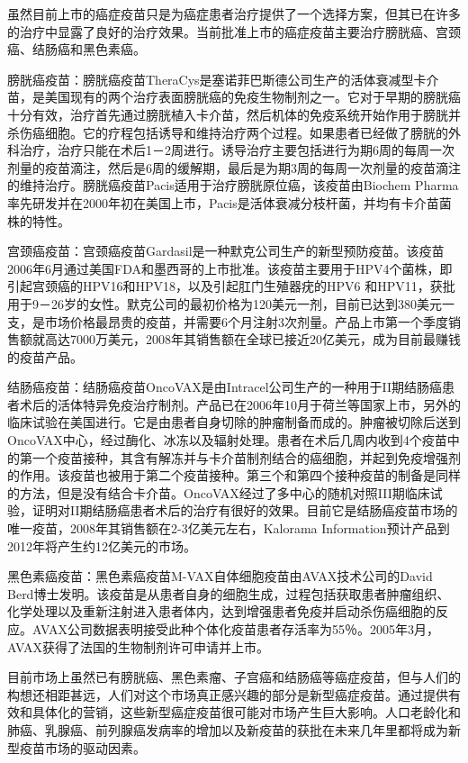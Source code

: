 虽然目前上市的癌症疫苗只是为癌症患者治疗提供了一个选择方案，但其已在许多的治疗中显露了良好的治疗效果。当前批准上市的癌症疫苗主要治疗膀胱癌、宫颈癌、结肠癌和黑色素癌。

膀胱癌疫苗：膀胱癌疫苗TheraCys是塞诺菲巴斯德公司生产的活体衰减型卡介苗，是美国现有的两个治疗表面膀胱癌的免疫生物制剂之一。它对于早期的膀胱癌十分有效，治疗首先通过膀胱植入卡介苗，然后机体的免疫系统开始作用于膀胱并杀伤癌细胞。它的疗程包括诱导和维持治疗两个过程。如果患者已经做了膀胱的外科治疗，治疗只能在术后1－2周进行。诱导治疗主要包括进行为期6周的每周一次剂量的疫苗滴注，然后是6周的缓解期，最后是为期3周的每周一次剂量的疫苗滴注的维持治疗。膀胱癌疫苗Pacis适用于治疗膀胱原位癌，该疫苗由Biochem
Pharma率先研发并在2000年初在美国上市，Pacis是活体衰减分枝杆菌，并均有卡介苗菌株的特性。

宫颈癌疫苗：宫颈癌疫苗Gardasil是一种默克公司生产的新型预防疫苗。该疫苗2006年6月通过美国FDA和墨西哥的上市批准。该疫苗主要用于HPV4个菌株，即引起宫颈癌的HPV16和HPV18，以及引起肛门生殖器疣的HPV6
和HPV11，获批用于9－26岁的女性。默克公司的最初价格为120美元一剂，目前已达到380美元一支，是市场价格最昂贵的疫苗，并需要6个月注射3次剂量。产品上市第一个季度销售额就高达7000万美元，2008年其销售额在全球已接近20亿美元，成为目前最赚钱的疫苗产品。

结肠癌疫苗：结肠癌疫苗OncoVAX是由Intracel公司生产的一种用于II期结肠癌患者术后的活体特异免疫治疗制剂。产品已在2006年10月于荷兰等国家上市，另外的临床试验在美国进行。它是由患者自身切除的肿瘤制备而成的。肿瘤被切除后送到OncoVAX中心，经过酶化、冰冻以及辐射处理。患者在术后几周内收到4个疫苗中的第一个疫苗接种，其含有解冻并与卡介苗制剂结合的癌细胞，并起到免疫增强剂的作用。该疫苗也被用于第二个疫苗接种。第三个和第四个接种疫苗的制备是同样的方法，但是没有结合卡介苗。OncoVAX经过了多中心的随机对照III期临床试验，证明对II期结肠癌患者术后的治疗有很好的效果。目前它是结肠癌疫苗市场的唯一疫苗，2008年其销售额在2-3亿美元左右，Kalorama
Information预计产品到2012年将产生约12亿美元的市场。

黑色素癌疫苗：黑色素癌疫苗M-VAX自体细胞疫苗由AVAX技术公司的David
Berd博士发明。该疫苗是从患者自身的细胞生成，过程包括获取患者肿瘤组织、化学处理以及重新注射进入患者体内，达到增强患者免疫并启动杀伤癌细胞的反应。AVAX公司数据表明接受此种个体化疫苗患者存活率为55％。2005年3月，AVAX获得了法国的生物制剂许可申请并上市。

目前市场上虽然已有膀胱癌、黑色素瘤、子宫癌和结肠癌等癌症疫苗，但与人们的构想还相距甚远，人们对这个市场真正感兴趣的部分是新型癌症疫苗。通过提供有效和具体化的营销，这些新型癌症疫苗很可能对市场产生巨大影响。人口老龄化和肺癌、乳腺癌、前列腺癌发病率的增加以及新疫苗的获批在未来几年里都将成为新型疫苗市场的驱动因素。

